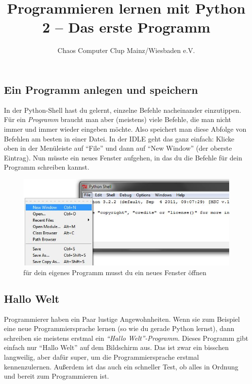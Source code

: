 



	\title{Programmieren lernen mit Python\\2 – Das erste Programm}
	\author{Chaos Computer Clup Mainz/Wiesbaden e.V.}
	\maketitle
	
	\subsection*{Ein Programm anlegen und speichern}
	In der Python-Shell hast du gelernt, einzelne Befehle nacheinander einzutippen. Für ein \emph{Programm} braucht man aber (meistens) viele Befehle, die man nicht immer und immer wieder eingeben möchte. Also speichert man diese Abfolge von Befehlen am besten in einer Datei. In der IDLE geht das ganz einfach: Klicke oben in der Menüleiste auf \enquote{File} und dann auf \enquote{New Window} (der oberste Eintrag). Nun müsste ein neues Fenster aufgehen, in das du die Befehle für dein Programm schreiben kannst.
	
	\begin{figure}[htbp]
		\centering
		\includegraphics[width=1\textwidth]{img/new.jpg}
		\caption{für dein eigenes Programm musst du ein neues Fenster öffnen}
		\label{new}
	\end{figure}
	
	\subsection*{Hallo Welt}
	Programmierer haben ein Paar lustige Angewohnheiten. Wenn sie zum Beispiel eine neue Programmiersprache lernen (so wie du gerade Python lernst), dann schreiben sie meistens erstmal ein \emph{\enquote{Hallo Welt}-Programm}. Dieses Programm gibt einfach nur \enquote{Hallo Welt} auf dem Bildschirm aus. Das ist zwar ein bisschen langweilig, aber dafür super, um die Programmiersprache erstmal kennenzulernen. Außerdem ist das auch ein schneller Test, ob alles in Ordnung und bereit zum Programmieren ist.
	
